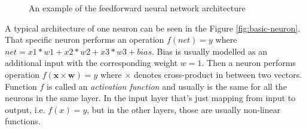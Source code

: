 \begin{figure}

\caption{An example of the feedforward neural network architecture}
\label{fig:basic-cnn}
\end{figure}

A typical architecture of one neuron can be seen in the Figure \ref{fig:basic-neuron}. That specific neuron performs an operation $ f(net) = y $ where $net = x1*w1 + x2*w2 + x3*w3 + bias$.  Bias is usually modelled as an additional input with the corresponding weight $w=1$. Then a neuron performs operation $ f(\pmb x \times \pmb w) = y$ where $\times$ denotes cross-product in between two vectors. Function $f$ is called an \textit{activation function} and usually is the same for all the neurons in the same layer. In the input layer that's just mapping from input to output, i.e. $f(x) = y$, but in the other layers, those are usually non-linear functions. 

